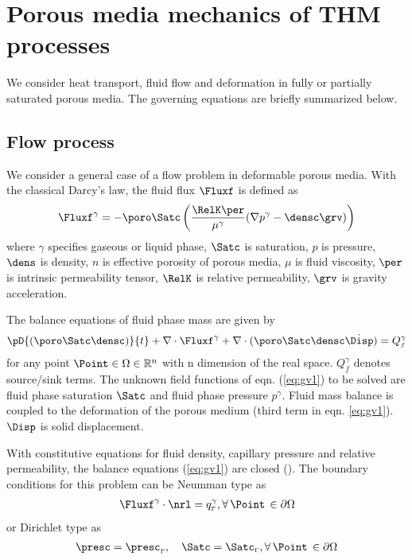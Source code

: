 \section{Porous media mechanics of THM processes}
\label{sec:prob}

We consider heat transport, fluid flow and deformation in fully or
partially saturated porous media. The
governing equations are briefly summarized below.

\subsection{Flow process}
\label{sec:flow}

We consider a general case of a flow problem in deformable porous
media. With the classical Darcy's law, the fluid flux $\Fluxf$ is
defined as
%
\begin{gather}
\Fluxf^{\gamma} = -\poro
\Satc\left(\dfrac{\RelK\per}{\mu^{\gamma}}(\nabla
p^{\gamma}-\densc\grv)\right)
 \label{eq:fflux}
\end{gather}
%
where $\gamma$ specifies gaseous or liquid phase, $\Satc$ is saturation, $p$ is pressure,  $\dens$ is
density, $n$ is effective porosity of porous media, $\mu$ is fluid
viscosity, $\per$ is intrinsic permeability tensor, $\RelK$ is
relative permeability, $\grv$ is gravity acceleration.

The balance equations of fluid phase mass are given by
\begin{gather}
\pD{(\poro\Satc\densc)}{t}+ \nabla\cdot\Fluxf^{\gamma}+\nabla\cdot (
\poro \Satc\densc \dot \Disp)=Q_{\scriptscriptstyle f}^{\gamma}
 \label{eq:gv1}
\end{gather}
for any point $\Point\in \Omega\in \mathbb{R}^{\mathrm{n}}$ with
$\mathrm n$ dimension of the real space. $Q_{\scriptscriptstyle
f}^{\gamma}$ denotes source/sink terms. The unknown field
functions of eqn. (\ref{eq:gv1}) to be solved are fluid phase
saturation $\Satc$ and fluid phase pressure $p^{\gamma}$. Fluid
mass balance is coupled to the deformation of the porous medium
(third term in eqn. \ref{eq:gv1}). $\Disp$ is solid displacement.

With constitutive equations for fluid density, capillary pressure
and  relative permeability, the balance equations (\ref{eq:gv1}) are
closed (\cite{Kol:02}). The boundary conditions for this problem can
be Neumman type as
\begin{gather}
\Fluxf^{\gamma} \cdot \nrl =
q^{\gamma}_{\scriptscriptstyle{\Gamma}}, \forall\, \Point\,\in
\partial \Omega
 \label{eq:bcgv1}
\end{gather}
or Dirichlet  type as
\begin{gather}
\presc = \presc_{\scriptscriptstyle{\Gamma}}, \quad \Satc =
\Satc_{\scriptscriptstyle{\Gamma}},
 \forall\, \Point\, \in \partial \Omega
 \label{eq:bcgv2}
\end{gather}

